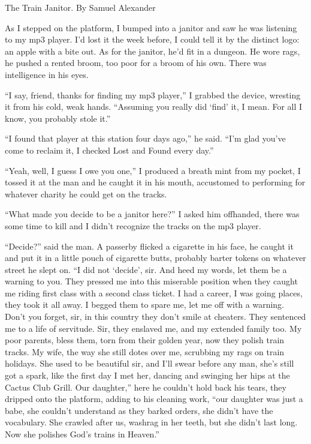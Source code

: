 \documentclass[oneside]{book}
\begin{document}
{
\large
The Train Janitor.  By Samuel Alexander
\par
}

\vspace{2mm}
As I stepped on the platform, I bumped into a janitor and saw he was listening to
my mp3 player.  I'd lost it the week before, I could tell it by the distinct
logo: an apple with a bite out.  As for the janitor, he'd fit in a dungeon.
He wore rags, he pushed a rented broom, too poor for a broom of his own.
There was intelligence in his eyes.

``I say, friend, thanks for finding my mp3 player,'' I grabbed the device, wresting it
from his cold, weak hands.  ``Assuming you really did `find' it, I mean.
For all I know, you probably stole it.''

``I found that player at this station four days ago,'' he said.  ``I'm glad you've come to reclaim it, I
checked Lost and Found every day.''

``Yeah, well, I guess I owe you one,'' I produced a breath mint from my pocket, I tossed it
at the man and he caught it in his mouth, accustomed to performing for whatever charity he could get on the tracks.

``What made you decide to be a janitor here?'' I asked him offhanded, there was some time to kill and I didn't
recognize the tracks on the mp3 player.

``Decide?'' said the man.  A passerby flicked a cigarette in his face, he caught it and put it in a little pouch
of cigarette butts, probably barter tokens on whatever street he slept on.  ``I
did not `decide', sir.  And heed my words, let them be a warning to you.  They pressed me into this miserable
position when they caught me riding first class with a second class ticket.
I had a career, I was going places, they took it all away.
I begged them to spare me, let me off with a warning.  Don't you forget, sir, in this country they
don't smile at cheaters.  They
sentenced me to a life of servitude.
Sir, they enslaved me, and my extended family too.  My poor parents, bless them, torn from their golden year,
now they polish train tracks.  My wife, the way she still dotes over me, scrubbing my rags on train holidays.
She used to be beautiful sir, and I'll swear before any man, she's still got a
spark, like the first day I met her, dancing and swinging her hips at the Cactus Club Grill.  Our
daughter,'' here he couldn't hold back his tears, they dripped onto the platform, adding to his cleaning work,
``our daughter was just a babe, she couldn't understand as they barked orders, she
didn't have the vocabulary.  She crawled after us, washrag in her teeth, but she didn't
last long.
Now she polishes God's trains in Heaven.''
\end{document}

